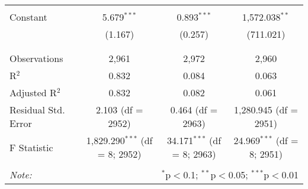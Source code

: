 \begin{table}[!htbp]
\begin{tabular}{@{\extracolsep{5pt}}lccc}
  & & & \\ 
 Constant & 5.679$^{***}$ & 0.893$^{***}$ & 1,572.038$^{**}$ \\ 
  & (1.167) & (0.257) & (711.021) \\ 
  & & & \\ 
\hline \\[-1.8ex] 
Observations & 2,961 & 2,972 & 2,960 \\ 
R$^{2}$ & 0.832 & 0.084 & 0.063 \\ 
Adjusted R$^{2}$ & 0.832 & 0.082 & 0.061 \\ 
Residual Std. Error & 2.103 (df = 2952) & 0.464 (df = 2963) & 1,280.945 (df = 2951) \\ 
F Statistic & 1,829.290$^{***}$ (df = 8; 2952) & 34.171$^{***}$ (df = 8; 2963) & 24.969$^{***}$ (df = 8; 2951) \\ 
\hline 
\hline \\[-1.8ex] 
\textit{Note:}  & \multicolumn{3}{r}{$^{*}$p$<$0.1; $^{**}$p$<$0.05; $^{***}$p$<$0.01} \\ 
\end{tabular} 
\end{table} 
